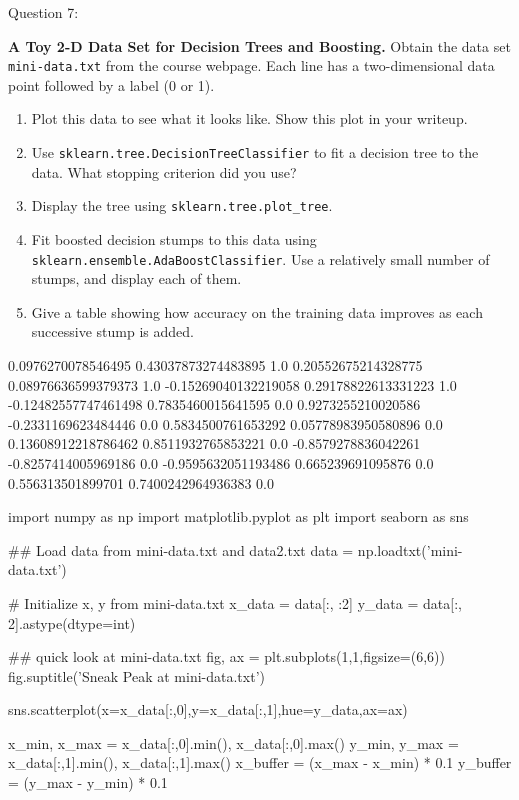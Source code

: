 Question 7:  \item \textbf{A Toy 2-D Data Set for Decision Trees and Boosting.} Obtain the data set \texttt{mini-data.txt} from the course webpage. Each line has a two-dimensional data point followed by a label (0 or 1).
\begin{enumerate}
  \item Plot this data to see what it looks like. Show this plot in your writeup.
  \item Use \texttt{sklearn.tree.DecisionTreeClassifier} to fit a decision tree to the data. What stopping criterion did you use?
  \item Display the tree using \texttt{sklearn.tree.plot\_tree}.
  \item Fit boosted decision stumps to this data using \texttt{sklearn.ensemble.AdaBoostClassifier}. Use a relatively small number of stumps, and display each of them.
  \item Give a table showing how accuracy on the training data improves as each successive stump is added.
\end{enumerate}


0.0976270078546495 0.43037873274483895 1.0
0.20552675214328775 0.08976636599379373 1.0
-0.15269040132219058 0.29178822613331223 1.0
-0.12482557747461498 0.7835460015641595 0.0
0.9273255210020586 -0.2331169623484446 0.0
0.5834500761653292 0.05778983950580896 0.0
0.13608912218786462 0.8511932765853221 0.0
-0.8579278836042261 -0.8257414005969186 0.0
-0.9595632051193486 0.665239691095876 0.0
0.556313501899701 0.7400242964936383 0.0

import numpy as np
import matplotlib.pyplot as plt
import seaborn as sns

## Load data from mini-data.txt and data2.txt
data = np.loadtxt('mini-data.txt')

# Initialize x, y from mini-data.txt
x_data = data[:, :2]
y_data = data[:, 2].astype(dtype=int)

## quick look at mini-data.txt
fig, ax = plt.subplots(1,1,figsize=(6,6))
fig.suptitle('Sneak Peak at mini-data.txt')

sns.scatterplot(x=x_data[:,0],y=x_data[:,1],hue=y_data,ax=ax)

x_min, x_max = x_data[:,0].min(), x_data[:,0].max()
y_min, y_max = x_data[:,1].min(), x_data[:,1].max()
x_buffer = (x_max - x_min) * 0.1 
y_buffer = (y_max - y_min) * 0.1

